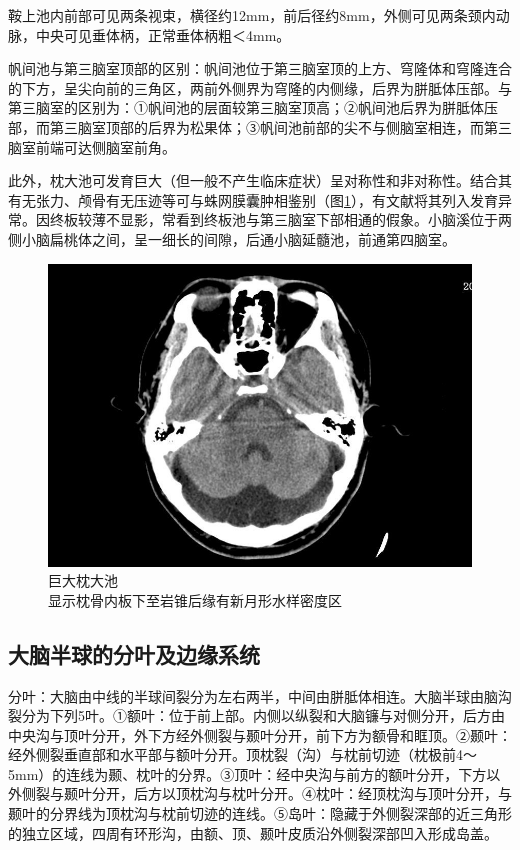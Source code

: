 鞍上池内前部可见两条视束，横径约12mm，前后径约8mm，外侧可见两条颈内动脉，中央可见垂体柄，正常垂体柄粗＜4mm。

帆间池与第三脑室顶部的区别：帆间池位于第三脑室顶的上方、穹隆体和穹隆连合的下方，呈尖向前的三角区，两前外侧界为穹隆的内侧缘，后界为胼胝体压部。与第三脑室的区别为：①帆间池的层面较第三脑室顶高；②帆间池后界为胼胝体压部，而第三脑室顶部的后界为松果体；③帆间池前部的尖不与侧脑室相连，而第三脑室前端可达侧脑室前角。

此外，枕大池可发育巨大（但一般不产生临床症状）呈对称性和非对称性。结合其有无张力、颅骨有无压迹等可与蛛网膜囊肿相鉴别（图\ref{fig2-2}），有文献将其列入发育异常。因终板较薄不显影，常看到终板池与第三脑室下部相通的假象。小脑溪位于两侧小脑扁桃体之间，呈一细长的间隙，后通小脑延髓池，前通第四脑室。

\begin{figure}[!htbp]
 \centering
 \includegraphics[width=.7\textwidth,height=\textheight,keepaspectratio]{./images/Image00006.jpg}
 \captionsetup{justification=centering}
 \caption{巨大枕大池 \\{\small 显示枕骨内板下至岩锥后缘有新月形水样密度区}}
 \label{fig2-2}
  \end{figure} 


\subsection{大脑半球的分叶及边缘系统}

分叶：大脑由中线的半球间裂分为左右两半，中间由胼胝体相连。大脑半球由脑沟裂分为下列5叶。①额叶：位于前上部。内侧以纵裂和大脑镰与对侧分开，后方由中央沟与顶叶分开，外下方经外侧裂与颞叶分开，前下方为额骨和眶顶。②颞叶：经外侧裂垂直部和水平部与额叶分开。顶枕裂（沟）与枕前切迹（枕极前4～5mm）的连线为颞、枕叶的分界。③顶叶：经中央沟与前方的额叶分开，下方以外侧裂与颞叶分开，后方以顶枕沟与枕叶分开。④枕叶：经顶枕沟与顶叶分开，与颞叶的分界线为顶枕沟与枕前切迹的连线。⑤岛叶：隐藏于外侧裂深部的近三角形的独立区域，四周有环形沟，由额、顶、颞叶皮质沿外侧裂深部凹入形成岛盖。

